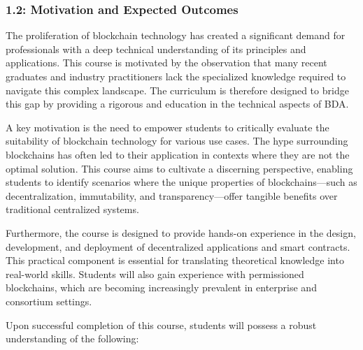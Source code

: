 \subsubsection{1.2: Motivation and Expected
	Outcomes}\label{motivation-and-expected-outcomes}

The proliferation of blockchain technology has created a significant
demand for professionals with a deep technical understanding of its
principles and applications. This course is motivated by the observation
that many recent graduates and industry practitioners lack the
specialized knowledge required to navigate this complex landscape. The
curriculum is therefore designed to bridge this gap by providing a
rigorous and  education in the technical aspects of BDA.

A key motivation is the need to empower students to critically evaluate
the suitability of blockchain technology for various use cases. The hype
surrounding blockchains has often led to their application in contexts
where they are not the optimal solution. This course aims to cultivate a
discerning perspective, enabling students to identify scenarios where
the unique properties of blockchains---such as decentralization,
immutability, and transparency---offer tangible benefits over
traditional centralized systems.

Furthermore, the course is designed to provide hands-on experience in
the design, development, and deployment of decentralized applications
and smart contracts. This practical component is essential for
translating theoretical knowledge into real-world skills. Students will
also gain experience with permissioned blockchains, which are becoming
increasingly prevalent in enterprise and consortium settings.

Upon successful completion of this course, students will possess a
robust understanding of the following:


